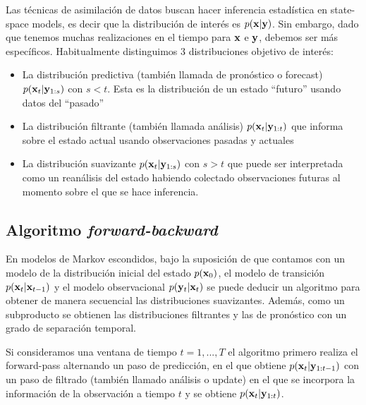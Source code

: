 Las técnicas de asimilación de datos buscan hacer inferencia estadística en state-space models, es decir que la distribución de interés es $p(\mathbf{x} | \mathbf{y})$. Sin embargo, dado que tenemos muchas realizaciones en el tiempo para $\mathbf{x}$ e $\mathbf{y}$, debemos ser más específicos. Habitualmente distinguimos 3 distribuciones objetivo de interés:
\begin{itemize}
    \item La distribución predictiva (también llamada de pronóstico o forecast) $p(\mathbf{x}_t | \mathbf{y}_{1:s})$ con $s < t$. Esta es la distribución de un estado ``futuro'' usando datos del ``pasado''
    \item La distribución filtrante (también llamada análisis) $p(\mathbf{x}_t | \mathbf{y}_{1:t})$ que informa sobre el estado actual usando observaciones pasadas y actuales
    \item La distribución suavizante $p(\mathbf{x}_t | \mathbf{y}_{1:s})$ con $s > t$ que puede ser interpretada como un reanálisis del estado habiendo colectado observaciones futuras al momento sobre el que se hace inferencia.
\end{itemize}

\subsection{Algoritmo \textit{forward-backward}}

En modelos de Markov escondidos, bajo la suposición de que contamos con un modelo de la distribución inicial del estado $p(\mathbf{x}_0)$, el modelo de transición $p(\mathbf{x}_t | \mathbf{x}_{t-1})$ y el modelo observacional $p(\mathbf{y}_t | \mathbf{x}_t)$ se puede deducir un algoritmo para obtener de manera secuencial las distribuciones suavizantes. Además, como un subproducto se obtienen las distribuciones filtrantes y las de pronóstico con un grado de separación temporal. 

Si consideramos una ventana de tiempo $t = 1, ..., T$ el algoritmo primero realiza el forward-pass alternando un paso de predicción, en el que obtiene $p(\mathbf{x}_t | \mathbf{y}_{1:t-1})$ con un paso de filtrado (también llamado análisis o update) en el que se incorpora la información de la observación a tiempo $t$ y se obtiene $p(\mathbf{x}_t | \mathbf{y}_{1:t})$. 

